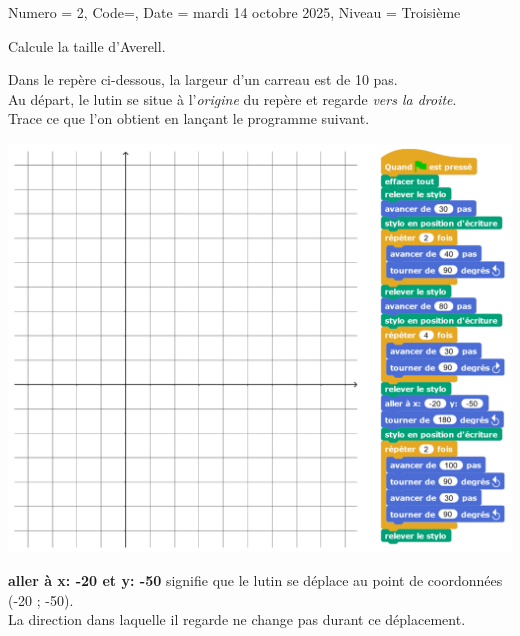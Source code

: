 \documentclass[11pt]{article}
\begin{document}
\begin{Maquette}[DM]{
        Numero = 2, Code={}, Date = mardi 14 octobre 2025, Niveau = Troisième
    }
\begin{exercice}
        Calcule la taille d’Averell.
    \end{exercice}

    \newpage
    \begin{exercice}[BaremeTotal = false]
        Dans le repère ci-dessous, la largeur d’un carreau est de 10 pas.\\
        Au départ, le lutin se situe à l’\emph{origine} du repère et regarde \emph{vers la droite}.\\
        Trace ce que l’on obtient en lançant le programme suivant.

        \begin{center}
            \includegraphics[width=\linewidth]{Images/DM2-scratch.png}
        \end{center}

        \textbf{aller à x: -20 et y: -50} signifie que le lutin se déplace au point de coordonnées (-20 ; -50).\\
        La direction dans laquelle il regarde ne change pas durant ce déplacement.
    \end{exercice}


\end{Maquette}
\end{document}
